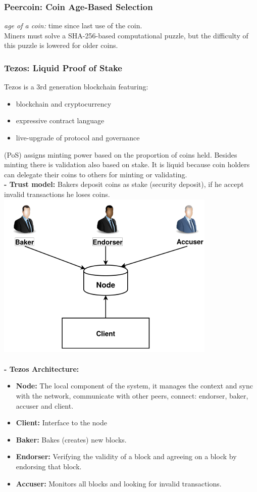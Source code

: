 \documentclass{article}
\begin{document}
\subsubsection{Peercoin: Coin Age-Based Selection}
\textit{age of a coin: } time since last use of the coin.\\
Miners must solve a SHA-256-based computational puzzle, but the difficulty of this puzzle is lowered for older coins.
\subsubsection{Tezos: Liquid Proof of Stake}
Tezos is a 3rd generation blockchain featuring:
\begin{itemize}
\item blockchain and cryptocurrency
\item expressive contract language
\item live-upgrade of protocol and governance
\end{itemize}
(PoS) assigns minting power based on the proportion of coins held. Besides minting there is validation also based on stake. It is liquid because coin holders can delegate their coins to others for minting or validating.\\
\textbf{- Trust model:} Bakers deposit coins as stake (security deposit), if he accept invalid transactions he loses coins.\\
\includegraphics[scale=0.7]{45.png}\\\\
\textbf{- Tezos Architecture: }\\
\begin{itemize}
\item \textbf{Node: }The local component of the system, it manages the context and sync with the network, communicate with other peers, connect: endorser, baker, accuser and client.
\item \textbf{Client: }Interface to the node
\item \textbf{Baker: }Bakes (creates) new blocks.
\item \textbf{Endorser: }Verifying the validity of a block and agreeing on a block by endorsing that block.
\item \textbf{Accuser: } Monitors all blocks and looking for invalid transactions.
\end{itemize}
\end{document}
